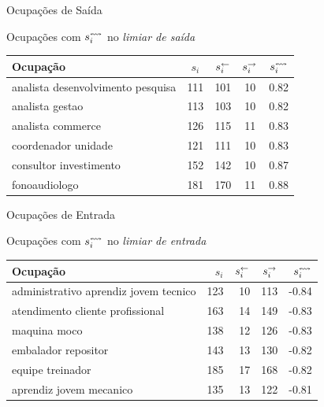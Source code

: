 \documentclass[10pt, hyperref={pdfpagelabels=false, unicode=true}, aspectratio=169]{beamer}
\begin{document}
\begin{frame}[label=hipotese-ponto-de-saida-tabela]{Ocupações de Saída}
  \begin{center}
    \large
    Ocupações com $s_i^\leftrightsquigarrow$ no \textit{limiar de saída}
    
    \normalsize
    \vspace{\baselineskip}
    
    \begin{tabular}{l|c|c|c|c}
      \hline
      Ocupação & $s_i$ & $s_i^\leftarrow$ & $s_i^\rightarrow$ & $s_i^\leftrightsquigarrow$\\
      \hline
      analista desenvolvimento pesquisa & 111 & 101 & 10 & 0.82\\
      \hline
      analista gestao & 113 & 103 & 10 & 0.82\\
      \hline
      analista commerce & 126 & 115 & 11 & 0.83\\
      \hline
      coordenador unidade & 121 & 111 & 10 & 0.83\\
      \hline
      consultor investimento & 152 & 142 & 10 & 0.87\\
      \hline
      fonoaudiologo & 181 & 170 & 11 & 0.88\\
      \hline
    \end{tabular}
  \end{center}
\end{frame}


\begin{frame}[label=hipotese-ponto-de-entrada-tabela]{Ocupações de Entrada}
  \begin{center}
    \large
    Ocupações com $s_i^\leftrightsquigarrow$ no \textit{limiar de entrada}
    
    \normalsize
    \vspace{\baselineskip}
    
    \begin{tabular}{l|r|r|r|r}
      \hline
      Ocupação & $s_i$ & $s_i^\leftarrow$ & $s_i^\rightarrow$ & $s_i^\leftrightsquigarrow$\\
      \hline
      administrativo aprendiz jovem tecnico & 123 & 10 & 113 & -0.84\\
      \hline
      atendimento cliente profissional & 163 & 14 & 149 & -0.83\\
      \hline
      maquina moco & 138 & 12 & 126 & -0.83\\
      \hline
      embalador repositor & 143 & 13 & 130 & -0.82\\
      \hline
      equipe treinador & 185 & 17 & 168 & -0.82\\
      \hline
      aprendiz jovem mecanico & 135 & 13 & 122 & -0.81\\
      \hline
    \end{tabular}
  \end{center}
\end{frame}
\end{document}
